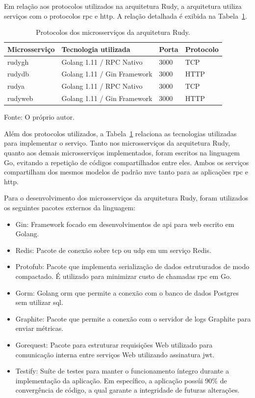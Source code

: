 Em relação aos protocolos utilizados na arquitetura Rudy, a arquitetura utiliza serviços com o protocolos \ac{rpc} e \ac{http}.
%
A relação detalhada é exibida na Tabela~\ref{tab:protocolos_rudy}.



\begin{table}[htb!]
    \centering
    \caption{Protocolos dos microsserviços da arquitetura Rudy.}
    \label{tab:protocolos_rudy}
    \begin{tabular}{|l|l|l|l|}
    \hline
    Microsserviço & Tecnologia utilizada        & Porta & Protocolo \\ \hline
    rudygh        & Golang 1.11 / RPC Nativo    & 3000  & TCP       \\ \hline
    rudydb        & Golang 1.11 / Gin Framework & 3000  & HTTP      \\ \hline
    rudya         & Golang 1.11 / RPC Nativo    & 3000  & TCP       \\ \hline
    rudyweb       & Golang 1.11 / Gin Framework & 3000  & HTTP      \\ \hline
    \end{tabular}
    
    Fonte: O próprio autor.
\end{table}


Além dos protocolos utilizados, a Tabela~\ref{tab:protocolos_rudy} relaciona as tecnologias utilizadas para implementar o serviço.
%
Tanto nos microsserviços da arquitetura Rudy, quanto aos demais microsserviços implementados, foram escritos na linguagem Go, evitando a repetição de códigos compartilhados entre eles.
%
Ambos os serviços compartilham dos mesmos modelos de padrão \ac{mvc} tanto para as aplicações \ac{rpc} e \ac{http}.

Para o desenvolvimento dos microsserviços da arquitetura Rudy, foram utilizados os seguintes pacotes externos da linguagem:

\begin{itemize}
    \item Gin: Framework focado em desenvolvimentos de \ac{api} para web escrito em Golang.
    \item Redis: Pacote de conexão sobre \ac{tcp} ou \ac{udp} em um serviço Redis.
    \item Protofub: Pacote que implementa serialização de dados estruturados de modo compactado. É utilizado para minimizar custo de chamadas \ac{rpc} em Go.
    \item Gorm: Golang \ac{orm} que permite a conexão com o banco de dados Postgres sem utilizar \ac{sql}.
    \item Graphite: Pacote que permite a conexão com o servidor de logs Graphite para enviar métricas.
    \item Gorequest: Pacote para estruturar requisições Web utilizado para comunicação interna entre serviços Web utilizando assinatura \ac{jwt}.
    \item Testify: Suíte de testes para manter o funcionamento íntegro durante a implementação da aplicação. Em específico, a aplicação possúi 90\% de convergência de código, a qual garante a integridade de futuras alterações.
\end{itemize}

